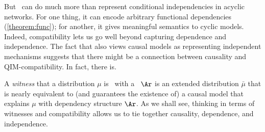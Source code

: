 But \scibility\ can do much more than represent conditional independencies in acyclic networks. 
%
%
For one thing, it can encode arbitrary 
    functional dependencies (\cref{theorem:func});
for another, it gives meaningful semantics to cyclic models.
%
%
%
Indeed, compatibility lets us go well beyond capturing dependence
and independence. The fact that \citet{pearl:2k} also views
causal models as representing independent mechanisms suggests that
there might be a connection between causality and
QIM-compatibility. In fact, there is.

A \emph{witness} that a distribution $\mu$ is \cible\ with a 
\hgraph\ $\Ar$ is an extended distribution $\bar\mu$ that 
is nearly equivalent to (and guarantees the existence of)
a causal model
that explains $\mu$ with dependency structure $\Ar$. 
As we shall see, thinking in terms of witnesses and compatibility
allows us to tie together causality, dependence, and independence.

